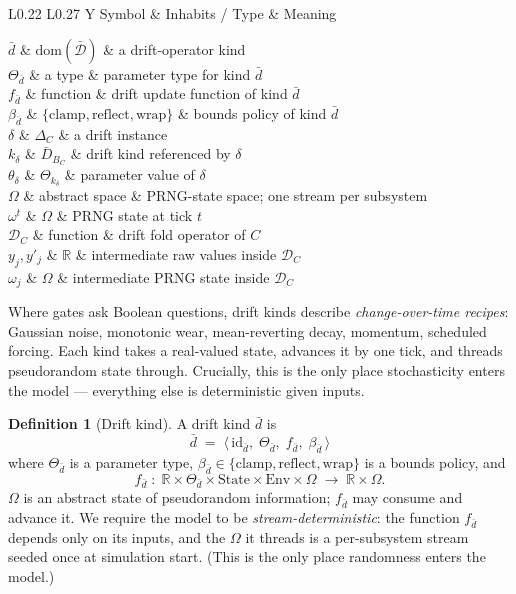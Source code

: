 \documentclass[journal,onecolumn,11pt]{IEEEtran}
\theoremstyle{definition}
\newtheorem{definition}{Definition}
\newcommand{\notationtable}[3]{%
  \begin{table}[ht]
  \centering
  \caption{#1}
  \label{#2}
  \small
  \renewcommand{\arraystretch}{1.1}
  \begin{tabularx}{\linewidth}{L{0.22\linewidth} L{0.27\linewidth} Y}
  \toprule
  Symbol & Inhabits / Type & Meaning \\
  \midrule
  #3
  \bottomrule
  \end{tabularx}
  \end{table}%
}
\begin{document}
\notationtable{Symbols introduced in \cref{sec:drift}.}{tab:notation-drift}{
$\bar{d}$                 & $\mathrm{dom}(\bar{\mathcal{D}})$ & a drift-operator kind \\
$\Theta_{\bar{d}}$        & a type                       & parameter type for kind $\bar{d}$ \\
$f_{\bar{d}}$             & function                     & drift update function of kind $\bar{d}$ \\
$\beta_{\bar{d}}$         & $\{\mathrm{clamp},\mathrm{reflect},\mathrm{wrap}\}$ & bounds policy of kind $\bar{d}$ \\
$\delta$                  & $\Delta_C$                   & a drift instance \\
$k_\delta$                & $\bar{D}_{B_C}$              & drift kind referenced by $\delta$ \\
$\theta_\delta$           & $\Theta_{k_\delta}$          & parameter value of $\delta$ \\
$\Omega$                  & abstract space               & PRNG-state space; one stream per subsystem \\
$\omega^t$                & $\Omega$                     & PRNG state at tick $t$ \\
$\mathcal{D}_C$           & function                     & drift fold operator of $C$ \\
$y_j, y'_j$               & $\mathbb{R}$                 & intermediate raw values inside $\mathcal{D}_C$ \\
$\omega_j$                & $\Omega$                     & intermediate PRNG state inside $\mathcal{D}_C$ \\
}

Where gates ask Boolean questions, drift kinds describe \emph{change-over-time recipes}: Gaussian noise, monotonic wear, mean-reverting decay, momentum, scheduled forcing. Each kind takes a real-valued state, advances it by one tick, and threads pseudorandom state through. Crucially, this is the only place stochasticity enters the model --- everything else is deterministic given inputs.

\begin{definition}[Drift kind]
A drift kind $\bar{d}$ is
\[
\bar{d} \;=\; \langle\, \mathrm{id}_{\bar{d}},\; \Theta_{\bar{d}},\; f_{\bar{d}},\; \beta_{\bar{d}} \,\rangle
\]
where $\Theta_{\bar{d}}$ is a parameter type, $\beta_{\bar{d}} \in \{\mathrm{clamp},\mathrm{reflect},\mathrm{wrap}\}$ is a bounds policy, and
\[
f_{\bar{d}} \;:\; \mathbb{R} \times \Theta_{\bar{d}} \times \mathrm{State} \times \mathrm{Env} \times \Omega \;\to\; \mathbb{R} \times \Omega.
\]
$\Omega$ is an abstract state of pseudorandom information; $f_{\bar{d}}$ may consume and advance it. We require the model to be \emph{stream-deterministic}: the function $f_{\bar{d}}$ depends only on its inputs, and the $\Omega$ it threads is a per-subsystem stream seeded once at simulation start. (This is the only place randomness enters the model.)
\end{definition}
\end{document}

